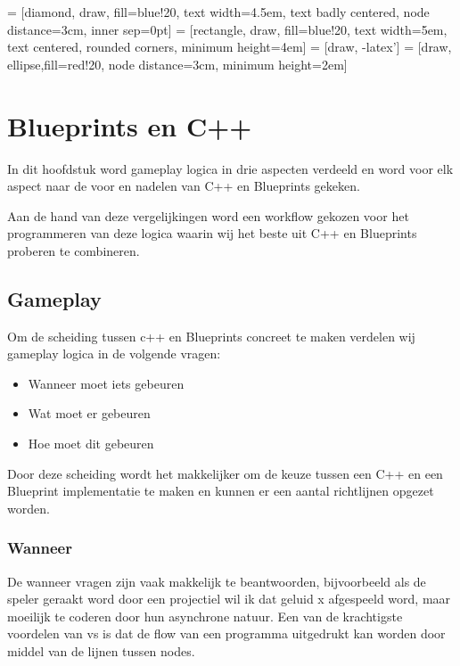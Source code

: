 \lstset {language=C++}
 = [diamond, draw, fill=blue!20, 
    text width=4.5em, text badly centered, node distance=3cm, inner sep=0pt]
 = [rectangle, draw, fill=blue!20, 
    text width=5em, text centered, rounded corners, minimum height=4em]
 = [draw, -latex']
 = [draw, ellipse,fill=red!20, node distance=3cm,
    minimum height=2em]

\chapter{Blueprints en C++}

In dit hoofdstuk word gameplay logica in drie aspecten verdeeld en word voor elk aspect naar de voor en nadelen van C++ en Blueprints gekeken.

Aan de hand van deze vergelijkingen word een workflow gekozen voor het programmeren van deze logica waarin wij het beste uit C++ en Blueprints proberen te combineren.

\section{Gameplay}

Om de scheiding tussen c++ en Blueprints concreet te maken verdelen wij gameplay logica in de volgende vragen:

\begin{itemize}
	\item Wanneer moet iets gebeuren
	\item Wat moet er gebeuren
	\item Hoe moet dit gebeuren
\end{itemize}

Door deze scheiding wordt het makkelijker om de keuze tussen een C++ en een Blueprint implementatie te maken en kunnen er een aantal richtlijnen opgezet worden.

\subsection{Wanneer}
De wanneer vragen zijn vaak makkelijk te beantwoorden, bijvoorbeeld als de speler geraakt word door een projectiel wil ik dat geluid x afgespeeld word, maar moeilijk te coderen door hun asynchrone natuur. Een van de krachtigste voordelen van \gls{vs} is dat de flow van een programma uitgedrukt kan worden door middel van de lijnen tussen nodes. 

